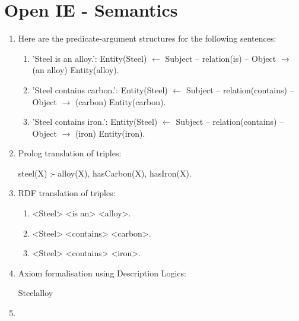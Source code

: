 \documentclass{article}
\begin{document}
\section{Open IE - Semantics}
\begin{enumerate}
  \item Here are the predicate-argument structures for the following sentences:
  \begin{enumerate}
    \item 'Steel is an alloy.': Entity(Steel) $\leftarrow$ Subject --
    relation(is) -- Object $\rightarrow$ (an alloy) Entity(alloy).
    \item 'Steel contains carbon.': Entity(Steel) $\leftarrow$ Subject --
    relation(contains) -- Object $\rightarrow$ (carbon) Entity(carbon).
    \item 'Steel contains iron.': Entity(Steel) $\leftarrow$ Subject --
    relation(contains) -- Object $\rightarrow$ (iron) Entity(iron).
  \end{enumerate}
  \item Prolog translation of triples:\par
    \noindent steel(X) :- alloy(X), hasCarbon(X), hasIron(X).
  \item RDF translation of triples:
  \begin{enumerate}
    \item <Steel> <is an> <alloy>.
    \item <Steel> <contains> <carbon>.
    \item <Steel> <contains> <iron>.
  \end{enumerate}
  \item Axiom formalisation using Description Logics: \par
     Steel\equiv alloy
  \item
\end{enumerate}
\end{document}
